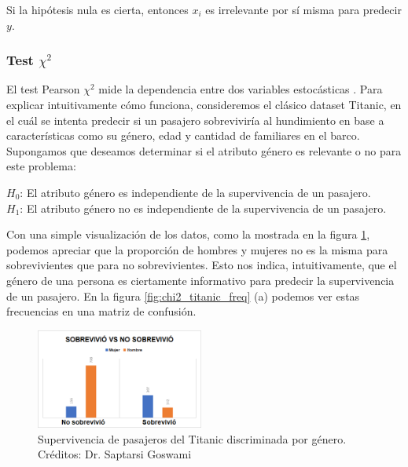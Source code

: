 Si la hipótesis nula es cierta, entonces $x_i$ es irrelevante por sí misma para predecir $y$. 

\subsubsection{Test $\chi^2$}
El test Pearson $\chi^2$ mide la dependencia entre dos variables estocásticas 
\cite{chi2}. Para explicar intuitivamente cómo funciona, consideremos el clásico dataset Titanic, en el cuál se intenta predecir si un pasajero sobreviviría al hundimiento en base a características como su género, edad y cantidad de familiares en el barco.  \\

Supongamos que deseamos determinar si el atributo género es relevante o no para este problema:

\begin{adjustwidth}{2cm}{}
\textbf{$H_0$}: El atributo género es independiente de la supervivencia de un pasajero. \\
\textbf{$H_1$}: El atributo género no es independiente de la supervivencia de un pasajero. \\
\end{adjustwidth}

Con una simple visualización de los datos, como la mostrada en la figura \ref{fig:chi2_titanic}, podemos apreciar que la proporción de hombres y mujeres no es la misma para sobrevivientes que para no sobrevivientes. Esto nos indica, intuitivamente, que el género de una persona es ciertamente informativo para predecir la supervivencia de un pasajero. En la figura \ref{fig:chi2_titanic_freq} (a) podemos ver estas frecuencias en una matriz de confusión. 

\begin{figure}[h!]
\centering
  \includegraphics[width=0.49\textwidth]{Kap6/chi2titanic.png}
\caption{ Supervivencia de pasajeros del Titanic discriminada por género. Créditos: Dr. Saptarsi Goswami }
\label{fig:chi2_titanic}
\end{figure}


